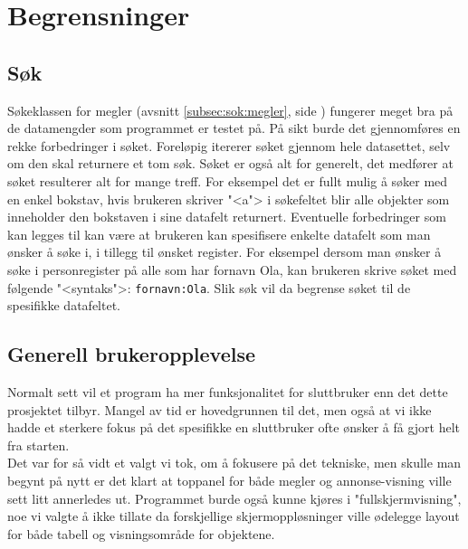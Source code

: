 \section{Begrensninger}

\subsection{Søk} \label{subsec:begrensinger:sok}
Søkeklassen for megler (avsnitt \ref{subsec:sok:megler}, side \pageref{subsec:sok:megler}) fungerer meget bra på de datamengder som programmet er testet på. På sikt burde det gjennomføres en rekke forbedringer i søket. Foreløpig itererer søket gjennom hele datasettet, selv om den skal returnere et tom søk. Søket er også alt for generelt, det medfører at søket resulterer alt for mange treff. For eksempel det er fullt mulig å søker med en enkel bokstav, hvis brukeren skriver "<a"> i søkefeltet blir alle objekter som inneholder den bokstaven i sine datafelt returnert. Eventuelle forbedringer som kan legges til kan være at brukeren kan spesifisere enkelte datafelt som man ønsker å søke i, i tillegg til ønsket register. For eksempel dersom man ønsker å søke i personregister på alle som har fornavn Ola, kan brukeren skrive søket med følgende "<syntaks">: \texttt{fornavn:Ola}. Slik søk vil da begrense søket til de spesifikke datafeltet.

\subsection{Generell brukeropplevelse}
Normalt sett vil et program ha mer funksjonalitet for sluttbruker enn det dette prosjektet tilbyr. Mangel av tid er hovedgrunnen til det, men også at vi ikke hadde et sterkere fokus på det spesifikke en sluttbruker ofte ønsker å få gjort helt fra starten. \\
Det var for så vidt et valgt vi tok, om å fokusere på det tekniske, men skulle man begynt på nytt er det klart at toppanel for både megler og annonse-visning ville sett litt annerledes ut. Programmet burde også kunne kjøres i "fullskjermvisning", noe vi valgte å ikke tillate da forskjellige skjermoppløsninger ville ødelegge layout for både tabell og visningsområde for objektene.

